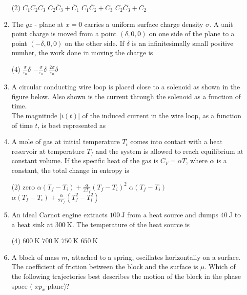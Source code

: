 \begin{enumerate}
 \begin{tasks}(2)
	\task[\textbf{a.}]$C_{1} C_{2} C_{3}$
	\task[\textbf{b.}]$C_{2} \bar{C}_{3}+\bar{C}_{1}$
	\task[\textbf{c.}]$C_{1} \bar{C}_{2}+C_{3}$
	\task[\textbf{d.}] $C_{2} \bar{C}_{3}+C_{2}$	
\end{tasks}
\item The $y z$ - plane at $x=0$ carries a uniform surface charge density $\sigma$. A unit point charge is moved from a point $(\delta, 0,0)$ on one side of the plane to a point $(-\delta, 0,0)$ on the other side. If $\delta$ is an infinitesimally small positive number, the work done in moving the charge is
 \begin{tasks}(4)
	\task[\textbf{b.}]$\frac{\sigma}{\varepsilon_{0}} \delta$
	\task[\textbf{c.}]$-\frac{\sigma}{\varepsilon_{0}} \delta$
	\task[\textbf{d.}]$\frac{2 \sigma}{\varepsilon_{0}} \delta$ 
\end{tasks}
\item A circular conducting wire loop is placed close to a solenoid as shown in the figure below. Also shown is the current through the solenoid as a function of time.	\\
The magnitude $|i(t)|$ of the induced current in the wire loop, as a function of time $t$, is best represented as
\item A mole of gas at initial temperature $T_{i}$ comes into contact with a heat reservoir at temperature $T_{f}$ and the system is allowed to reach equilibrium at constant volume. If the specific heat of the gas is $C_{V}=\alpha T$, where $\alpha$ is a constant, the total change in entropy is
 \begin{tasks}(2)
	\task[\textbf{a.}]zero
	\task[\textbf{b.}] $\alpha\left(T_{f}-T_{i}\right)+\frac{\alpha}{2 T_{f}}\left(T_{f}-T_{i}\right)^{2}$
	\task[\textbf{c.}] $\alpha\left(T_{f}-T_{i}\right)$
	\task[\textbf{d.}]$\alpha\left(T_{f}-T_{i}\right)+\frac{\alpha}{2 T_{f}}\left(T_{f}^{2}-T_{i}^{2}\right)$
\end{tasks}
\item An ideal Carnot engine extracts $100 \mathrm{~J}$ from a heat source and dumps $40 \mathrm{~J}$ to a heat sink at $300 \mathrm{~K}$. The temperature of the heat source is
 \begin{tasks}(4)
	\task[\textbf{a.}]$600 \mathrm{~K}$
	\task[\textbf{b.}]$700 \mathrm{~K}$
	\task[\textbf{c.}] $750 \mathrm{~K}$
	\task[\textbf{d.}] $650 \mathrm{~K}$
\end{tasks}
\item A block of mass $m$, attached to a spring, oscillates horizontally on a surface. The coefficient of friction between the block and the surface is $\mu$. Which of the following trajectories best describes the motion of the block in the phase space ( $x p_{x}$-plane)?	

\end{enumerate}
